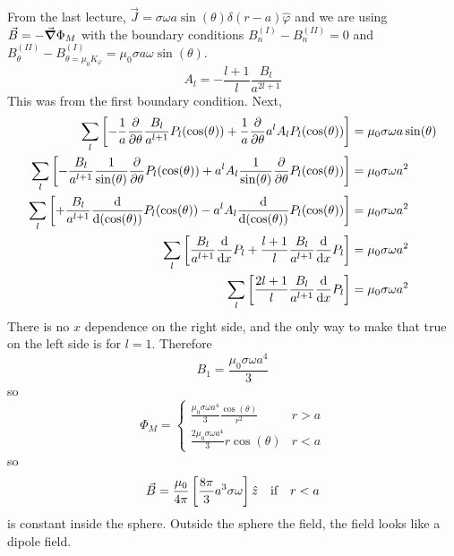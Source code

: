 \documentclass[a4paper,twoside,master.tex]{subfiles}
\begin{document}
\begin{ex}
    From the last lecture, $ \vec{J} = \sigma \omega a \sin(\theta) \delta(r-a) \hat{\varphi} $ and we are using $ \vec{B} = - \grad{\Phi_M} $ with the boundary conditions $ B_n^{(I)}-B_n^{(II)} = 0 $ and $ B^{(II)}_{\theta} - B^{(I)}_{\theta = \mu_0 K_{\varphi}} = \mu_0 \sigma a \omega \sin(\theta) $.
    \begin{equation}
        A_l = - \frac{l+1}{l} \frac{B_l}{a^{2l+1}}
    \end{equation}
    This was from the first boundary condition. Next,
    \begin{align}
        \sum_l\left[-\frac{1}{a} \pdv{\theta} \frac{B_l}{a^{l+1}} P_l(\cos(\theta)) + \frac{1}{a} \pdv{\theta}a^{l} A_l P_l(\cos(\theta))\right] &= \mu_0 \sigma \omega a \sin(\theta)\\
        \sum_l\left[-\frac{B_l}{a^{l+1}} \frac{1}{\sin(\theta)} \pdv{\theta}P_l(\cos(\theta)) + a^l A_l \frac{1}{\sin(\theta)} \pdv{\theta}  P_l(\cos(\theta))\right] &= \mu_0 \sigma \omega a^2\\
        \sum_l\left[+\frac{B_l}{a^{l+1}} \dv{(\cos(\theta))}P_l(\cos(\theta)) - a^l A_l \dv{(\cos(\theta))}P_l(\cos(\theta))\right] &= \mu_0 \sigma \omega a^2\\
        \sum_l\left[\frac{B_l}{a^{l+1}} \dv{x}P_l + \frac{l+1}{l} \frac{B_l}{a^{l+1}} \dv{x}P_l\right] &= \mu_0 \sigma \omega a^2\\
        \sum_l\left[\frac{2l+1}{l} \frac{B_l}{a^{l+1}} \dv{x}P_l\right] &= \mu_0 \sigma \omega a^2
    \end{align}
    There is no $ x $ dependence on the right side, and the only way to make that true on the left side is for $ l = 1 $. Therefore
    \begin{equation}
        B_1 = \frac{\mu_0 \sigma \omega a^4}{3}
    \end{equation}
    so
    \begin{equation}
        \Phi_M =
        \begin{cases}
            \frac{\mu_0 \sigma \omega a^4}{3} \frac{\cos(\theta)}{r^2} & r > a\\
            \frac{2\mu_0 \sigma \omega a^4}{3} r \cos(\theta) & r < a
        \end{cases}
    \end{equation}
    so
    \begin{equation}
        \vec{B} = \frac{\mu_0}{4 \pi} \left[ \frac{8 \pi}{3} a^3 \sigma \omega \right] \hat{z} \qif r<a
    \end{equation}
    is constant inside the sphere. Outside the sphere the field, the field looks like a dipole field.
\end{ex}
\end{document}
